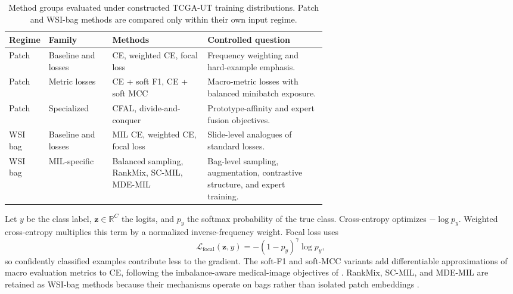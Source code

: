 \documentclass[11pt]{article}
\begin{document}
\begin{table}[ht]
  \centering
  \footnotesize
  \begin{tabularx}{\linewidth}{@{}p{0.12\linewidth}p{0.20\linewidth}p{0.30\linewidth}X@{}}
    \toprule
    Regime & Family & Methods & Controlled question\\
    \midrule
    Patch & Baseline and losses & CE, weighted CE, focal loss & Frequency weighting and hard-example emphasis.\\
    Patch & Metric losses & CE + soft F1, CE + soft MCC & Macro-metric losses with balanced minibatch exposure.\\
    Patch & Specialized & CFAL, divide-and-conquer & Prototype-affinity and expert fusion objectives.\\
    WSI bag & Baseline and losses & MIL CE, weighted CE, focal loss & Slide-level analogues of standard losses.\\
    WSI bag & MIL-specific & Balanced sampling, RankMix, SC-MIL, MDE-MIL & Bag-level sampling, augmentation, contrastive structure, and expert training.\\
    \bottomrule
  \end{tabularx}
  \caption{Method groups evaluated under constructed TCGA-UT training distributions. Patch and WSI-bag methods are compared only within their own input regime.}
  \label{tab:method-groups}
\end{table}

Let $y$ be the class label, $\mathbf{z}\in\mathbb{R}^C$ the logits, and $p_y$ the softmax probability of the true class. Cross-entropy optimizes $-\log p_y$. Weighted cross-entropy multiplies this term by a normalized inverse-frequency weight. Focal loss uses
\begin{equation}
  \mathcal{L}_{\mathrm{focal}}(\mathbf{z},y)
  = -(1-p_y)^\gamma \log p_y,
  \label{eq:focal}
\end{equation}
\noindent so confidently classified examples contribute less to the gradient. The soft-F1 and soft-MCC variants add differentiable approximations of macro evaluation metrics to CE, following the imbalance-aware medical-image objectives of \citet{scholz2024imbalanceAware}. RankMix, SC-MIL, and MDE-MIL are retained as WSI-bag methods because their mechanisms operate on bags rather than isolated patch embeddings \citep{chen2023rankmix,juyal2024scMil,ling2025mdeMil}.
\end{document}
